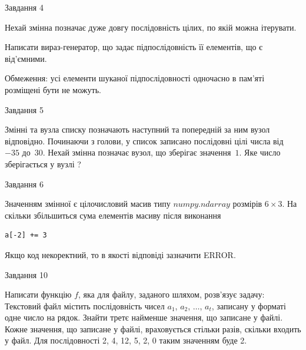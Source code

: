 \documentclass[12pt, ukrainian]{article}
\begin{document}
{               
{\begin{center}Завдання {4}\end{center}}
\vspace{-6mm}
Нехай змінна  позначає дуже довгу послідовність цілих, по якій можна ітерувати.

Написати вираз-генератор, що задає підпослідовність її елементів, що є від'єм\-ни\-ми.

Обмеження: усі елементи шуканої підпослідовності одночасно в пам'яті розміщені бути не можуть.\par

\vspace{10mm}
               
{\begin{center}Завдання {5}\end{center}}
\vspace{-6mm}
Змінні  та  вузла списку позначають наступний та попередній за ним вузол відповідно. Починаючи з голови, у список записано послідовні цілі числа від~$-35$ до~$30$. Нехай змінна  позначає вузол, що зберігає значення~$1$.
Яке число зберігається у вузлі  ?\par

               
{\begin{center}Завдання {6}\end{center}}
\vspace{-6mm}
Значенням змінної  є цілочисловий масив типу $numpy.ndarray$ розмірів $6{\times}3$. На скільки збільшиться сума елементів масиву  після виконання
\begin{verbatim}
a[-2] += 3
\end{verbatim}


Якщо код некоректний, то в якості відповіді зазначити ERROR.\par

               
{\begin{center}Завдання {10}\end{center}}
\vspace{-6mm}

Написати функцію $f$, яка для файлу, заданого шляхом, розв’язує задачу:\\ Текстовий файл містить послідовність чисел $a_1$, $a_2$, $\ldots$, $a_t$, записану у форматі одне число на рядок. Знайти третє найменше значення, що записане у файлі. Кожне значення, що записане у файлі, враховується стільки разів, скільки входить у файл. Для послідовності 2, 4, 12, 5, 2, 0 таким значенням буде 2.

}
\end{document}
